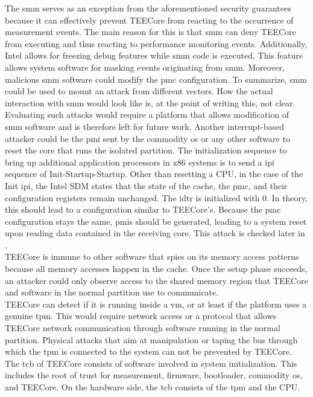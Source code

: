 The \gls{smm} serves as an exception from the aforementioned security guarantees
because it can effectively prevent TEECore from reacting to the occurrence of
measurement events. The main reason for this is that \gls{smm} can deny TEECore
from executing and thus reacting to performance monitoring events. Additionally,
Intel allows for freezing debug features while \gls{smm} code is executed. This
feature allows system software for masking events originating from
\gls{smm}.\cite{intel_sdm} Moreover, malicious \gls{smm} software could modify
the \gls{pmc} configuration. To summarize, \gls{smm} could be used to mount an
attack from different vectors. How the actual interaction with \gls{smm} would
look like is, at the point of writing this, not clear. Evaluating such attacks
would require a platform that allows modification of \gls{smm} software and is
therefore left for future work. Another interrupt-based attacker could be the
\gls{pmi} sent by the commodity \gls{os} or any other software to reset the core
that runs the isolated partition. The initialization sequence to bring up
additional application processors in x86 systems is to send a \gls{ipi} sequence
of Init-Startup-Startup. Other than resetting a CPU, in the case of the Init
\gls{ipi}, the Intel SDM states that the state of the cache, the \gls{pmc}, and
their configuration registers remain unchanged. The \gls{idtr} is initialized
with 0. In theory, this should lead to a configuration similar to TEECore's.
Because the \gls{pmc} configuration stays the same, \glspl{pmi} should be
generated, leading to a system reset upon reading data contained in the
receiving core. This attack is checked later in .\\

TEECore is immune to other software that spies on its memory access patterns
because all memory accesses happen in the cache. Once the setup phase succeeds,
an attacker could only observe access to the shared memory region that TEECore
and software in the normal partition use to communicate.\\

TEECore can detect if it is running inside a \gls{vm}, or at least if the
platform uses a genuine \gls{tpm}. This would require network access or a
protocol that allows TEECore network communication through software running in
the normal partition. Physical attacks that aim at manipulation or taping the
bus through which the \gls{tpm} is connected to the system can not be prevented
by TEECore. The \gls{tcb} of TEECore consists of software involved in
system initialization. This includes the root of trust for measurement,
firmware, bootloader, commodity \gls{os}, and TEECore. On the hardware side, the
\gls{tcb} consists of the \gls{tpm} and the CPU.

\cleardoublepage

